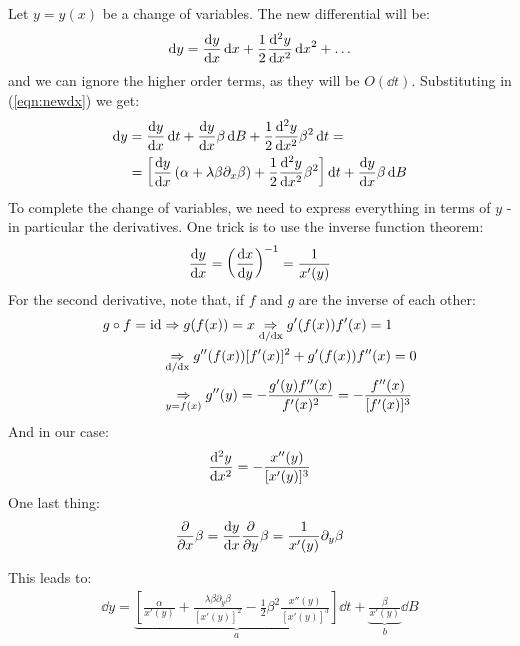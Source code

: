 \documentclass[../template.tex]{subfiles}
\begin{document}
\begin{exo}
    Let $y=y(x)$ be a change of variables. The new differential will be:
    \begin{align*}
        \dd{y} = \dv{y}{x} \dd{x} + \frac{1}{2} \dv[2]{y}{x} \dd{x}^2 + \dots
    \end{align*}
    and we can ignore the higher order terms, as they will be $O(\dd{t})$. Substituting in (\ref{eqn:newdx}) we get:
    \begin{align*}
        \dd{y} &= \dv{y}{x} (\alpha + \lambda \beta \partial_x \beta) \dd{t} + \dv{y}{x} \beta \dd{B} + \frac{1}{2} \dv[2]{y}{x} \beta^2 \dd{t}  =\\
        &= \left[\dv{y}{x}\left(\alpha+ \lambda \beta \partial_x \beta \right) + \frac{1}{2} \dv[2]{y}{x} \beta^2 \right]\dd{t} + \dv{y}{x} \beta \dd{B}
    \end{align*}
    To complete the change of variables, we need to express everything in terms of $y$ - in particular the derivatives. One trick is to use the inverse function theorem:
    \begin{align*}
        \dv{y}{x} = \left(\dv{x}{y}\right)^{-1} = \frac{1}{x'(y)} 
    \end{align*}
    For the second derivative, note that, if $f$ and $g$ are the inverse of each other:
    \begin{align*}
        g \circ f = \operatorname{id} &\Rightarrow g(f(x)) = x \underset{\rm d/dx}{\Rightarrow} g'(f(x)) f'(x) = 1\\
         &\underset{\rm d/dx}{\Rightarrow} g''(f(x)) [f'(x)]^2 + g'(f(x)) f''(x) = 0 \\&\underset{y=f(x)}{\Rightarrow}  g''(y) = - \frac{g'(y) f''(x)}{f'(x)^2} = - \frac{f''(x)}{[f'(x)]^3}  
    \end{align*}
    And in our case:
    \begin{align*}
        \dv[2]{y}{x} = -\frac{x''(y)}{[x'(y)]^3} 
    \end{align*}
    One last thing:
    \begin{align*}
        \pdv{x} \beta = \dv{y}{x} \pdv{y} \beta = \frac{1}{x'(y)} \partial_y \beta 
    \end{align*}
    
    This leads to:
    \begin{align*}
        \dd{y} = \underbrace{\left[\frac{\alpha}{x'(y)} + \frac{\lambda \beta \partial_y \beta}{[x'(y)]^2} - \frac{1}{2} \beta^2 \frac{x''(y)}{[x'(y)]^3}    \right]}_{a}  \dd{t} + \underbrace{\frac{\beta}{x'(y)}}_{b}  \dd{B} 
    \end{align*}
    

\end{exo}
\end{document}
